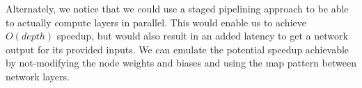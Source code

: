 Alternately, we notice that we could use a staged pipelining approach to be able to actually compute layers in parallel.
This would enable us to achieve $O(depth)$ speedup, but would also result in an added latency to get a network output for its provided inputs.
We can emulate the potential speedup achievable by not-modifying the node weights and biases and using the map pattern between network layers.



